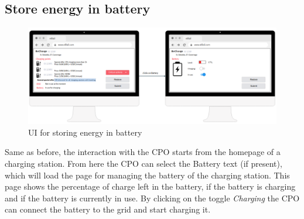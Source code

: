 \subsection{Store energy in battery}
\begin{figure}[H]
    \centering
    \includegraphics[width=1\textwidth]{Images/cp3/storeEnergyInBattery.png}
    \caption{UI for storing energy in battery}
\end{figure}
Same as before, the interaction with the CPO starts from the homepage of a charging station. From here the CPO can select the Battery text (if present), which will load the page for managing the battery of the charging station. This page shows the percentage of charge left in the battery, if the battery is charging and if the battery is currently in use. By clicking on the toggle \textit{Charging} the CPO can connect the battery to the grid and start charging it.

